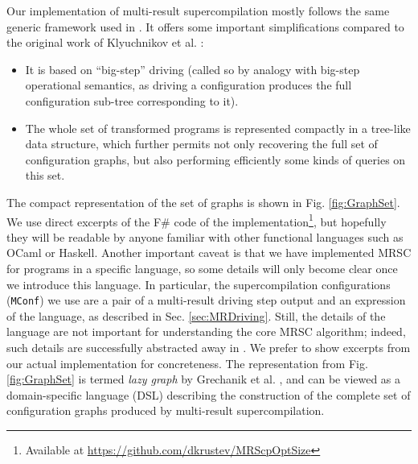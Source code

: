 \documentclass[submission,copyright,creativecommons]{eptcs}
\begin{document}
Our implementation of multi-result supercompilation mostly follows the same
generic framework used in \cite{Romanenko2014StagedMRSC,krustev2014approach}.
It offers some important simplifications compared to the original work
of Klyuchnikov et al. \cite{KlyuchnikovMRSCBranch,Klyuchnikov:META2012:MRSC}:
\begin{itemize}
  \item It is based on ``big-step'' driving (called so by analogy with big-step
    operational semantics, as driving a configuration produces
    the full configuration sub-tree corresponding to it).
  \item The whole set of transformed programs is represented compactly
    in a tree-like data structure, which further permits not only
    recovering the full set of configuration graphs, but also
    performing efficiently some kinds of queries on this set.
\end{itemize}
The compact representation of the set of graphs is shown in Fig. \ref{fig:GraphSet}.
We use direct excerpts of the F\# code of the implementation\footnote{Available at
\url{https://github.com/dkrustev/MRScpOptSize}}, but hopefully
they will be readable by anyone familiar with other functional languages such as OCaml or Haskell.
Another important caveat is that we have implemented MRSC for programs in a specific language,
so some details will only become clear once we introduce this language.
In particular, the supercompilation configurations (\verb|MConf|) we use are 
a pair of a multi-result driving step output and an expression of the language,
as described in Sec. \ref{sec:MRDriving}.
Still, the details of the language are not important for understanding the core
MRSC algorithm; indeed, such details are successfully abstracted away in \cite{Romanenko2014StagedMRSC,krustev2014approach}.
We prefer to show excerpts from our actual implementation for concreteness.
The representation from Fig. \ref{fig:GraphSet} is termed \emph{lazy graph} by Grechanik et al. \cite{Romanenko2014StagedMRSC},
and can be viewed as a domain-specific language (DSL) describing the construction of the
complete set of configuration graphs produced by multi-result supercompilation.
\end{document}
